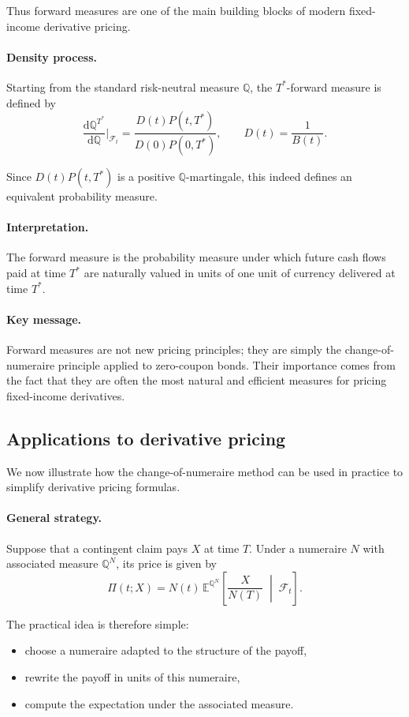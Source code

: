 \documentclass[11pt]{article}
\newcommand{\Qbb}{\mathbb{Q}}
\newcommand{\E}{\mathbb{E}}
\theoremstyle{definition}
\theoremstyle{plain}
\begin{document}
Thus forward measures are one of the main building blocks of modern
fixed-income derivative pricing.

\paragraph{Density process.}
Starting from the standard risk-neutral measure \(\Qbb\), the
\(T^\ast\)-forward measure is defined by
\[
\frac{\mathrm{d}\Qbb^{T^\ast}}{\mathrm{d}\Qbb}\Big|_{\mathcal{F}_t}
=
\frac{D(t)P(t,T^\ast)}{D(0)P(0,T^\ast)},
\qquad D(t)=\frac1{B(t)}.
\]

Since \(D(t)P(t,T^\ast)\) is a positive \(\Qbb\)-martingale, this indeed
defines an equivalent probability measure.

\paragraph{Interpretation.}
The forward measure is the probability measure under which future cash
flows paid at time \(T^\ast\) are naturally valued in units of one unit
of currency delivered at time \(T^\ast\).

\paragraph{Key message.}
Forward measures are not new pricing principles; they are simply the
change-of-numeraire principle applied to zero-coupon bonds.
Their importance comes from the fact that they are often the most
natural and efficient measures for pricing fixed-income derivatives.


\subsection{Applications to derivative pricing}

We now illustrate how the change-of-numeraire method can be used in
practice to simplify derivative pricing formulas.

\paragraph{General strategy.}
Suppose that a contingent claim pays \(X\) at time \(T\).
Under a numeraire \(N\) with associated measure \(\Qbb^N\), its price is
given by
\[
\Pi(t;X)
=
N(t)\,
\E^{\Qbb^N}\!\left[
\frac{X}{N(T)}
\;\middle|\;
\mathcal{F}_t
\right].
\]

The practical idea is therefore simple:
\begin{itemize}[leftmargin=1.4em]
\item choose a numeraire adapted to the structure of the payoff,
\item rewrite the payoff in units of this numeraire,
\item compute the expectation under the associated measure.
\end{itemize}
\end{document}
